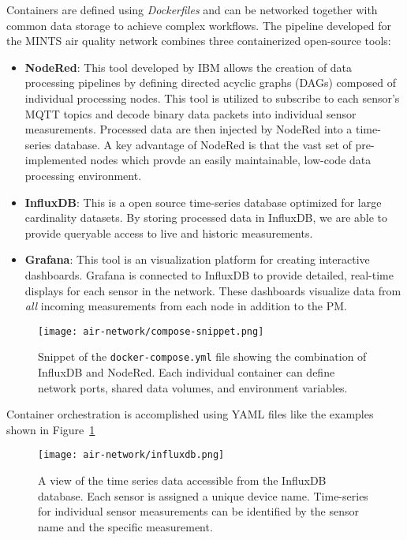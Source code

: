Containers are defined using \textit{Dockerfiles} and can be networked together
with common data storage to achieve complex workflows. The pipeline developed
for the MINTS air quality network combines three containerized open-source tools:
\begin{itemize}
\item \textbf{NodeRed}: This tool developed by IBM allows the creation of
  data processing pipelines by defining directed acyclic graphs (DAGs)
  composed of individual processing nodes. This tool is utilized to subscribe to
  each sensor's MQTT topics and decode binary data packets into individual
  sensor measurements. Processed data are then injected by NodeRed into a
  time-series database. A key advantage of NodeRed is that the vast set of
  pre-implemented nodes which provde an easily maintainable, low-code data
  processing environment.
\item \textbf{InfluxDB}: This is a open source time-series database optimized
  for large cardinality datasets. By storing processed data in InfluxDB, we are
  able to provide queryable access to live and historic measurements.
\item \textbf{Grafana}: This tool is an visualization platform for
  creating interactive dashboards. Grafana is connected to InfluxDB to provide
  detailed, real-time displays for each sensor in the network. These dashboards
  visualize data from \textit{all} incoming measurements from each node in
  addition to the PM.
\end{itemize}

\begin{figure}[!h]
  \centering
  \texttt{[image: air-network/compose-snippet.png]}
  \caption{Snippet of the \texttt{docker-compose.yml} file showing the
    combination of InfluxDB and NodeRed. Each individual container can define
    network ports, shared data volumes, and environment variables.}
  \label{fig:compose}
\end{figure}

Container orchestration is accomplished using YAML files like the examples shown
in Figure~\ref{fig:compose}




\begin{figure}[!h]
  \centering
  \texttt{[image: air-network/influxdb.png]}
  \caption{A view of the time series data accessible from the InfluxDB database.
  Each sensor is assigned a unique device name. Time-series for individual
  sensor measurements can be identified by the sensor name and the specific
  measurement.}
  \label{fig:influxdb}
\end{figure}




